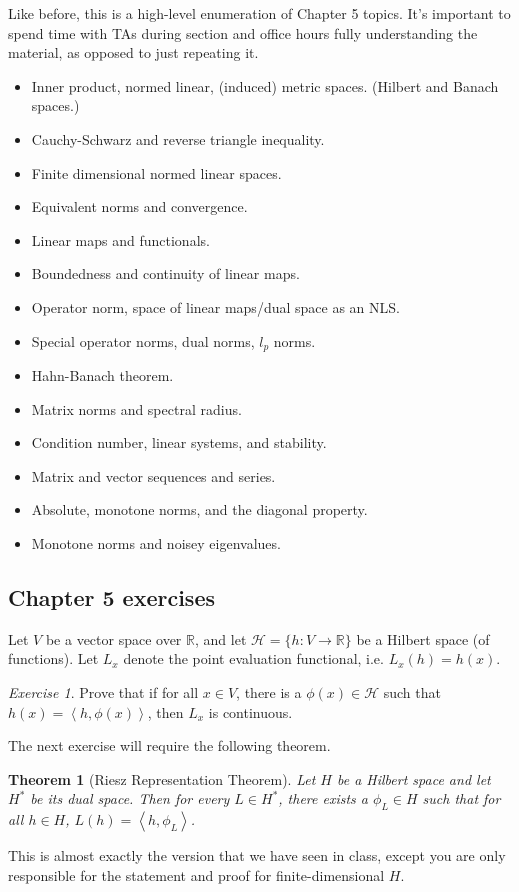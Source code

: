 \documentclass[11pt]{article}
\newcommand{\R}{\ensuremath{\mathbb R}}
\renewcommand{\H}{\ensuremath{\mathcal H}}
\newcommand{\ip}[2]{\left\langle #1, #2\right\rangle}
\theoremstyle{plain}
\newtheorem{thm}{Theorem}[section]
\theoremstyle{definition}
\theoremstyle{remark}
\newtheorem{exc}{Exercise}[section]
\begin{document}
Like before, this is a high-level enumeration of Chapter 5 topics. It's important to spend time with TAs during section and office hours fully understanding the material, as opposed to just repeating it.
\begin{itemize}
    \item Inner product, normed linear, (induced) metric spaces. (Hilbert and Banach spaces.)
    \item Cauchy-Schwarz and reverse triangle inequality.
    \item Finite dimensional normed linear spaces.
    \item Equivalent norms and convergence.
    \item Linear maps and functionals.
    \item Boundedness and continuity of linear maps.
    \item Operator norm, space of linear maps/dual space as an NLS.
    \item Special operator norms, dual norms, $l_p$ norms.
    \item Hahn-Banach theorem.
    \item Matrix norms and spectral radius.
    \item Condition number, linear systems, and stability.
    \item Matrix and vector sequences and series.
    \item Absolute, monotone norms, and the diagonal property.
    \item Monotone norms and noisey eigenvalues.
\end{itemize}

\subsection*{Chapter 5 exercises}

Let $V$ be a vector space over $\R$, and let $\H = \{h : V \rightarrow \R\}$ be a Hilbert space (of functions). Let $L_x$ denote the point evaluation functional, i.e. $L_x(h) = h(x)$.

\begin{exc}
    Prove that if for all $x \in V$, there is a $\phi(x) \in \H$ such that $h(x) = \ip{h}{\phi(x)}$, then $L_x$ is continuous. 
\end{exc}

The next exercise will require the following theorem.
\begin{thm}[Riesz Representation Theorem]
    Let $H$ be a Hilbert space and let $H^*$ be its dual space. Then for every $L \in H^*$, there exists a $\phi_L \in H$ such that for all $h \in H$, $L(h) = \ip{h}{\phi_L}$.
\end{thm}
This is almost exactly the version that we have seen in class, except you are only responsible for the statement and proof for finite-dimensional $H$.
\end{document}
